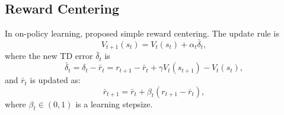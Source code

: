 
\subsection{Reward Centering}
In on-policy learning, \citet{naik2024reward} 
proposed simple reward centering.
The update rule is
\begin{equation}
V_{t+1}(s_t)=V_{t}(s_t)+\alpha_t \bar{\delta}_t,
\label{src1}
\end{equation}
where the new TD error $\bar{\delta}_t$ is
\begin{equation}
\bar{\delta}_t=\delta_t-\bar{r}_{t} = r_{t+1}-\bar{r}_{t}+\gamma V_{t}(s_{t+1})-V_t(s_t),
\label{src2}
\end{equation}
and $\bar{r}_{t}$ is updated as:
\begin{equation}
\bar{r}_{t+1}=\bar{r}_{t}+\beta_t (r_{t+1}-\bar{r}_{t}),
\label{src3}
\end{equation}
where $\beta_t\in (0,1)$ is a learning stepsize.

